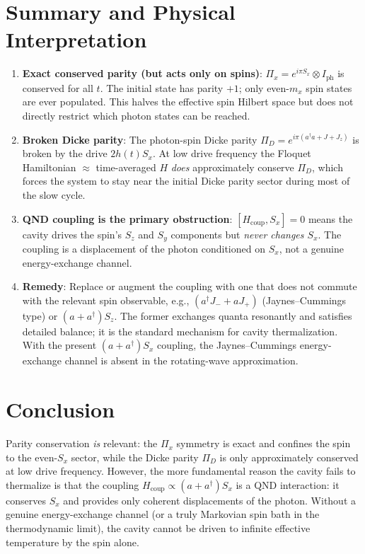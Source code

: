 \documentclass[12pt]{article}
\begin{document}
\section{Summary and Physical Interpretation}

\begin{enumerate}
  \item \textbf{Exact conserved parity (but acts only on spins)}:
        $\Pi_x = e^{i\pi S_x}\otimes I_\text{ph}$ is conserved for all $t$.
        The initial state has parity $+1$; only even-$m_x$ spin states are
        ever populated.  This halves the effective spin Hilbert space but does
        not directly restrict which photon states can be reached.

  \item \textbf{Broken Dicke parity}: The photon-spin Dicke parity
        $\Pi_D=e^{i\pi(a^\dagger a+J+J_z)}$ is broken by the drive $2h(t)S_x$.
        At low drive frequency the Floquet Hamiltonian $\approx$
        time-averaged $H$ \emph{does} approximately conserve $\Pi_D$, which
        forces the system to stay near the initial Dicke parity sector during
        most of the slow cycle.

  \item \textbf{QND coupling is the primary obstruction}:
        $[H_\text{coup}, S_x]=0$ means the cavity drives the spin's $S_z$ and
        $S_y$ components but \emph{never changes $S_x$}.  The coupling is a
        displacement of the photon conditioned on $S_x$, not a genuine
        energy-exchange channel.

  \item \textbf{Remedy}: Replace or augment the coupling with one that does
        not commute with the relevant spin observable, e.g.,
        $(a^\dagger J_- + a J_+)$ (Jaynes--Cummings type) or
        $(a+a^\dagger)S_z$.  The former exchanges quanta resonantly and
        satisfies detailed balance; it is the standard mechanism for cavity
        thermalization.  With the present $(a+a^\dagger)S_x$ coupling, the
        Jaynes--Cummings energy-exchange channel is absent in the rotating-wave
        approximation.
\end{enumerate}

\section{Conclusion}

Parity conservation \emph{is} relevant: the $\Pi_x$ symmetry is exact and
confines the spin to the even-$S_x$ sector, while the Dicke parity $\Pi_D$ is
only approximately conserved at low drive frequency.  However, the more
fundamental reason the cavity fails to thermalize is that the coupling
$H_\text{coup}\propto (a+a^\dagger)S_x$ is a QND interaction: it conserves $S_x$
and provides only coherent displacements of the photon.  Without a genuine
energy-exchange channel (or a truly Markovian spin bath in the thermodynamic
limit), the cavity cannot be driven to infinite effective temperature by the
spin alone.
\end{document}
